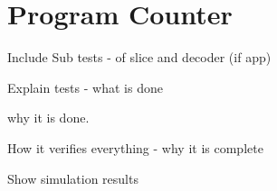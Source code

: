 
\section{Program Counter}

Include Sub tests - of slice and decoder (if app)

Explain tests - what is done

why it is done.

How it verifies everything - why it is complete

Show simulation results


